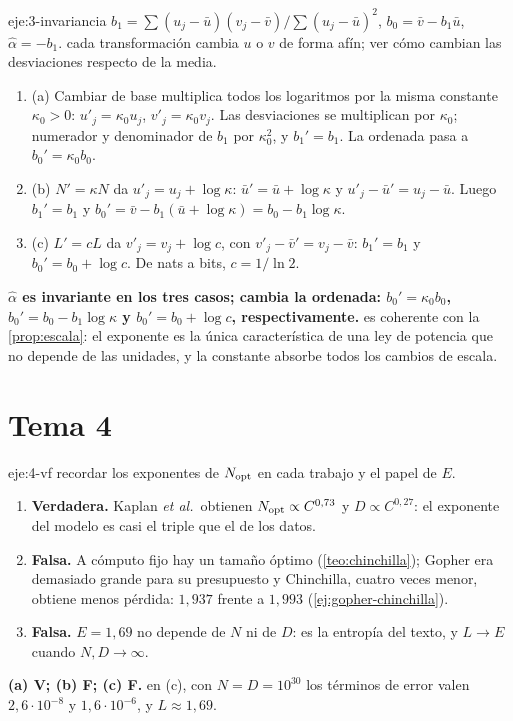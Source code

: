 \begin{solucion}{eje:3-invariancia}
\datos $b_1=\sum(u_j-\bar u)(v_j-\bar v)/\sum(u_j-\bar u)^{2}$, $b_0=\bar v-b_1\bar u$, $\hat\alpha=-b_1$.
\planteamiento cada transformación cambia $u$ o $v$ de forma afín; ver cómo cambian las desviaciones respecto de la media.
\pasos
\begin{enumerate}[label=\arabic*.]
  \item (a) Cambiar de base multiplica todos los logaritmos por la misma constante $\kappa_0>0$: $u'_j=\kappa_0u_j$, $v'_j=\kappa_0v_j$. Las desviaciones se multiplican por $\kappa_0$; numerador y denominador de $b_1$ por $\kappa_0^{2}$, y $b_1'=b_1$. La ordenada pasa a $b_0'=\kappa_0b_0$.
  \item (b) $N'=\kappa N$ da $u'_j=u_j+\log\kappa$: $\bar u'=\bar u+\log\kappa$ y $u'_j-\bar u'=u_j-\bar u$. Luego $b_1'=b_1$ y $b_0'=\bar v-b_1(\bar u+\log\kappa)=b_0-b_1\log\kappa$.
  \item (c) $L'=cL$ da $v'_j=v_j+\log c$, con $v'_j-\bar v'=v_j-\bar v$: $b_1'=b_1$ y $b_0'=b_0+\log c$. De nats a bits, $c=1/\ln 2$.
\end{enumerate}
\resultado \textbf{$\hat\alpha$ es invariante en los tres casos; cambia la ordenada: $b_0'=\kappa_0b_0$, $b_0'=b_0-b_1\log\kappa$ y $b_0'=b_0+\log c$, respectivamente.}
\comprobacion es coherente con la \cref{prop:escala}: el exponente es la única característica de una ley de potencia que no depende de las unidades, y la constante absorbe todos los cambios de escala.
\end{solucion}

\section{Tema 4}

\begin{solucion}{eje:4-vf}
\planteamiento recordar los exponentes de $N_{\mathrm{opt}}$ en cada trabajo y el papel de $E$.
\pasos
\begin{enumerate}[label=(\alph*)]
  \item \textbf{Verdadera.} Kaplan \emph{et al.}\ obtienen $N_{\mathrm{opt}}\propto C^{0{,}73}$ y $D\propto C^{0{,}27}$: el exponente del modelo es casi el triple que el de los datos.
  \item \textbf{Falsa.} A cómputo fijo hay un tamaño óptimo (\cref{teo:chinchilla}); Gopher era demasiado grande para su presupuesto y Chinchilla, cuatro veces menor, obtiene menos pérdida: $1{,}937$ frente a $1{,}993$ (\cref{ej:gopher-chinchilla}).
  \item \textbf{Falsa.} $E=1{,}69$ no depende de $N$ ni de $D$: es la entropía del texto, y $L\to E$ cuando $N,D\to\infty$.
\end{enumerate}
\resultado \textbf{(a) V; (b) F; (c) F.}
\comprobacion en (c), con $N=D=10^{30}$ los términos de error valen $2{,}6\cdot 10^{-8}$ y $1{,}6\cdot 10^{-6}$, y $L\approx 1{,}69$.
\end{solucion}

